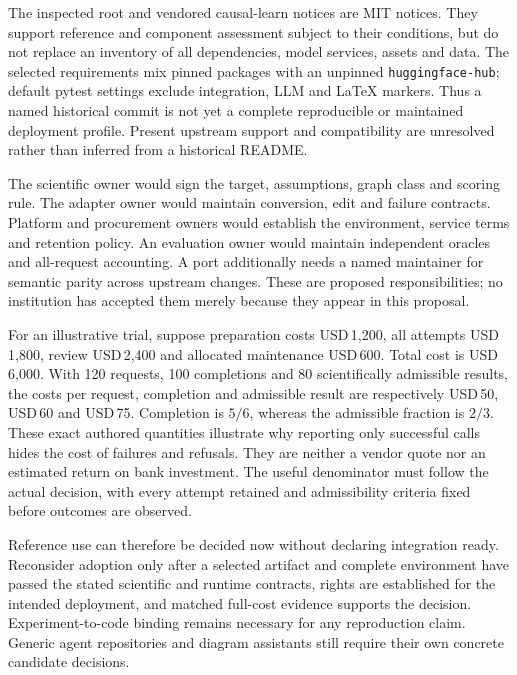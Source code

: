 The inspected root and vendored causal-learn notices are MIT notices. They
support reference and component assessment subject to their conditions, but
do not replace an inventory of all dependencies, model services, assets and
data. The selected requirements mix pinned packages with an unpinned
\texttt{huggingface-hub}; default pytest settings exclude integration, LLM
and LaTeX markers. Thus a named historical commit is not yet a complete
reproducible or maintained deployment profile. Present upstream support and
compatibility are unresolved rather than inferred from a historical README.
\citep{exec17_copilot_code,exec17_copilot_rights}

The scientific owner would sign the target, assumptions, graph class and
scoring rule. The adapter owner would maintain conversion, edit and failure
contracts. Platform and procurement owners would establish the environment,
service terms and retention policy. An evaluation owner would maintain
independent oracles and all-request accounting. A port additionally needs a
named maintainer for semantic parity across upstream changes. These are
proposed responsibilities; no institution has accepted them merely because
they appear in this proposal.~\citep{exec25_copilot_choice}

For an illustrative trial, suppose preparation costs USD\,1,200, all attempts
USD\,1,800, review USD\,2,400 and allocated maintenance USD\,600. Total cost
is USD\,6,000. With 120 requests, 100 completions and 80 scientifically
admissible results, the costs per request, completion and admissible result
are respectively USD\,50, USD\,60 and USD\,75. Completion is $5/6$, whereas
the admissible fraction is $2/3$. These exact authored quantities illustrate
why reporting only successful calls hides the cost of failures and refusals.
They are neither a vendor quote nor an estimated return on bank investment.
The useful denominator must follow the actual decision, with every attempt
retained and admissibility criteria fixed before outcomes are observed.
\citep{exec25_copilot_choice}

Reference use can therefore be decided now without declaring integration
ready. Reconsider adoption only after a selected artifact and complete
environment have passed the stated scientific and runtime contracts, rights
are established for the intended deployment, and matched full-cost evidence
supports the decision. Experiment-to-code binding remains necessary for any
reproduction claim. Generic agent repositories and diagram assistants still
require their own concrete candidate decisions.
\label{sec:exec25-copilot-reuse-end}




